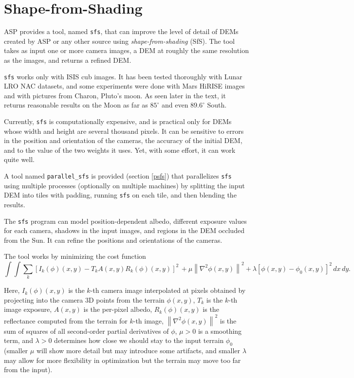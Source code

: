 \chapter{Shape-from-Shading}
\label{ch:sfs}

ASP provides a tool, named \texttt{sfs}, that can improve the level of
detail of DEMs created by ASP or any other source using
\textit{shape-from-shading} (SfS). The tool takes as input one or more
camera images, a DEM at roughly the same resolution as the images, and
returns a refined DEM.

\texttt{sfs} works only with ISIS cub images. It has been tested
thoroughly with Lunar LRO NAC datasets, and some experiments were done
with Mars HiRISE images and with pictures from Charon, Pluto's moon. As
seen later in the text, it returns reasonable results on the Moon as far
as $85^\circ$ and even $89.6^\circ$ South.

Currently, \texttt{sfs} is computationally expensive, and is practical
only for DEMs whose width and height are several thousand pixels. It can be 
sensitive to errors in the position and orientation of the cameras, the
accuracy of the initial DEM, and to the value of the two weights it uses.
Yet, with some effort, it can work quite well. 

A tool named \texttt{parallel\_sfs} is provided (section \ref{psfs}) 
that parallelizes \texttt{sfs} using multiple processes (optionally on
multiple machines) by splitting the input DEM into tiles with padding,
running \texttt{sfs} on each tile, and then blending the results. 

The \texttt{sfs} program can model position-dependent albedo, different
exposure values for each camera, shadows in the input images, and regions
in the DEM occluded from the Sun. It can refine the positions and orientations
of the cameras.

The tool works by minimizing the cost function
\begin{equation}\label{cost}
  \int\!\! \int \! \sum_k \left[ I_k(\phi)(x, y) - T_k A(x, y)
    R_k(\phi)(x, y) \right]^2\,  
  + \mu \left\|\nabla^2 \phi(x, y) \right\|^2  
  + \lambda  \left[ \phi(x, y) - \phi_0(x, y) \right]^2
  \, dx\, dy.
\end{equation}

Here, $I_k(\phi)(x, y)$ is the $k$-th camera image interpolated at
pixels obtained by projecting into the camera 3D points from the terrain
$\phi(x, y)$, $T_k$ is the $k$-th image exposure, $A(x, y)$ is the
per-pixel albedo, $R_k(\phi)(x, y)$ is the reflectance computed from the
terrain for $k$-th image, $\left\|\nabla^2 \phi(x, y) \right\|^2 $ is the sum
of squares of all second-order partial derivatives of $\phi$, $\mu > 0$
is a smoothing term, and $\lambda > 0$ determines how close we should
stay to the input terrain $\phi_0$ (smaller $\mu$ will show more detail
but may introduce some artifacts, and smaller $\lambda$ may allow for
more flexibility in optimization but the terrain may move too far from the input). 

